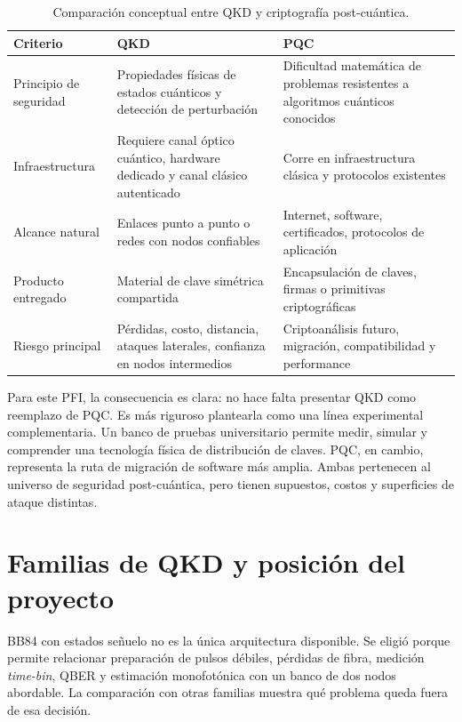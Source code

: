 \begin{table}[H]
  \centering
  \begin{tabularx}{\textwidth}{p{}XX}
    \toprule
    Criterio & QKD & PQC \\
    \midrule
    Principio de seguridad & Propiedades físicas de estados cuánticos y detección de perturbación & Dificultad matemática de problemas resistentes a algoritmos cuánticos conocidos \\
    Infraestructura & Requiere canal óptico cuántico, hardware dedicado y canal clásico autenticado & Corre en infraestructura clásica y protocolos existentes \\
    Alcance natural & Enlaces punto a punto o redes con nodos confiables & Internet, software, certificados, protocolos de aplicación \\
    Producto entregado & Material de clave simétrica compartida & Encapsulación de claves, firmas o primitivas criptográficas \\
    Riesgo principal & Pérdidas, costo, distancia, ataques laterales, confianza en nodos intermedios & Criptoanálisis futuro, migración, compatibilidad y performance \\
    \bottomrule
  \end{tabularx}
  \caption{Comparación conceptual entre QKD y criptografía post-cuántica.}
  \label{tab:qkd_pqc}
\end{table}

Para este PFI, la consecuencia es clara: no hace falta presentar QKD como reemplazo de PQC. Es más riguroso plantearla como una línea experimental complementaria. Un banco de pruebas universitario permite medir, simular y comprender una tecnología física de distribución de claves. PQC, en cambio, representa la ruta de migración de software más amplia. Ambas pertenecen al universo de seguridad post-cuántica, pero tienen supuestos, costos y superficies de ataque distintas.

\section{Familias de QKD y posición del proyecto}

BB84 con estados señuelo no es la única arquitectura disponible. Se eligió porque permite relacionar preparación de pulsos débiles, pérdidas de fibra, medición \textit{time-bin}, QBER y estimación monofotónica con un banco de dos nodos abordable. La comparación con otras familias muestra qué problema queda fuera de esa decisión.

